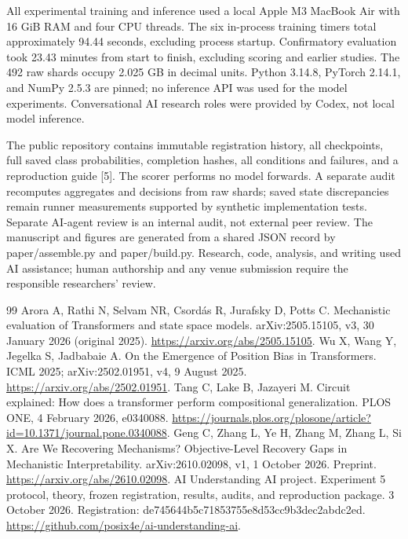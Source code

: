 \documentclass[10pt,letterpaper]{article}
\begin{document}
All experimental training and inference used a local Apple M3 MacBook Air with 16 GiB RAM and four CPU threads. The six in-process training timers total approximately 94.44 seconds, excluding process startup. Confirmatory evaluation took 23.43 minutes from start to finish, excluding scoring and earlier studies. The 492 raw shards occupy 2.025 GB in decimal units. Python 3.14.8, PyTorch 2.14.1, and NumPy 2.5.3 are pinned; no inference API was used for the model experiments. Conversational AI research roles were provided by Codex, not local model inference.

The public repository contains immutable registration history, all checkpoints, full saved class probabilities, completion hashes, all conditions and failures, and a reproduction guide [5]. The scorer performs no model forwards. A separate audit recomputes aggregates and decisions from raw shards; saved state discrepancies remain runner measurements supported by synthetic implementation tests. Separate AI-agent review is an internal audit, not external peer review. The manuscript and figures are generated from a shared JSON record by paper/assemble.py and paper/build.py. Research, code, analysis, and writing used AI assistance; human authorship and any venue submission require the responsible researchers' review.

\begin{thebibliography}{99}
 Arora A, Rathi N, Selvam NR, Csordás R, Jurafsky D, Potts C. Mechanistic evaluation of Transformers and state space models. arXiv:2505.15105, v3, 30 January 2026 (original 2025).
\url{https://arxiv.org/abs/2505.15105}.
 Wu X, Wang Y, Jegelka S, Jadbabaie A. On the Emergence of Position Bias in Transformers. ICML 2025; arXiv:2502.01951, v4, 9 August 2025.
\url{https://arxiv.org/abs/2502.01951}.
 Tang C, Lake B, Jazayeri M. Circuit explained: How does a transformer perform compositional generalization. PLOS ONE, 4 February 2026, e0340088.
\url{https://journals.plos.org/plosone/article?id=10.1371/journal.pone.0340088}.
 Geng C, Zhang L, Ye H, Zhang M, Zhang L, Si X. Are We Recovering Mechanisms? Objective-Level Recovery Gaps in Mechanistic Interpretability. arXiv:2610.02098, v1, 1 October 2026. Preprint.
\url{https://arxiv.org/abs/2610.02098}.
 AI Understanding AI project. Experiment 5 protocol, theory, frozen registration, results, audits, and reproduction package. 3 October 2026. Registration: de745644b5c71853755e8d53cc9b3dec2abdc2ed.
\url{https://github.com/posix4e/ai-understanding-ai}.
\end{thebibliography}
\end{document}
